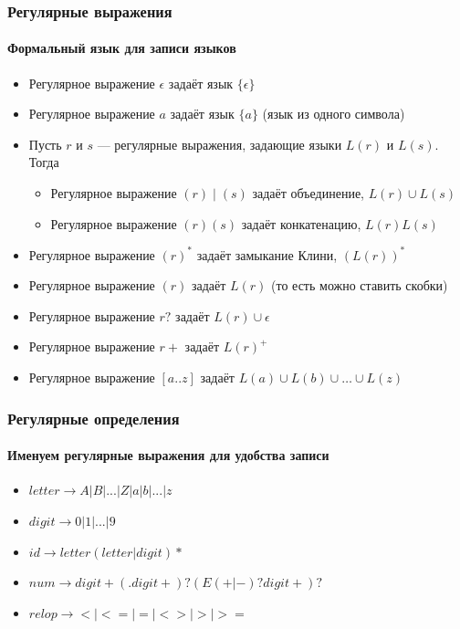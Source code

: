 \documentclass{../../slides-style}
\begin{document}
    \begin{frame}
        \frametitle{Регулярные выражения}
        \framesubtitle{Формальный язык для записи языков}
        \begin{itemize}
            \item Регулярное выражение $\epsilon$ задаёт язык $\{\epsilon\}$
            \item Регулярное выражение $a$ задаёт язык $\{a\}$ (язык из одного символа)
            \item Пусть $r$ и $s$ --- регулярные выражения, задающие языки $L(r)$ и $L(s)$. Тогда
            \begin{itemize}
                \item Регулярное выражение $(r) \mid (s)$ задаёт объединение, $L(r) \cup L(s)$
                \item Регулярное выражение $(r)(s)$ задаёт конкатенацию, $L(r)L(s)$
            \end{itemize}
            \item Регулярное выражение $(r)^*$ задаёт замыкание Клини, $(L(r))^*$
            \item Регулярное выражение $(r)$ задаёт $L(r)$ (то есть можно ставить скобки)
            \item Регулярное выражение $r?$ задаёт $L(r) \cup \epsilon$
            \item Регулярное выражение $r+$ задаёт $L(r)^+$
            \item Регулярное выражение $[a..z]$ задаёт $L(a) \cup L(b) \cup \ldots \cup L(z)$
        \end{itemize}
    \end{frame}

    \begin{frame}
        \frametitle{Регулярные определения}
        \framesubtitle{Именуем регулярные выражения для удобства записи}
        \begin{itemize}
            \item $letter \rightarrow A | B | ... | Z | a | b | ... | z$
            \item $digit \rightarrow 0 | 1 | ... | 9$
            \item $id \rightarrow letter (letter | digit)*$
            \item $num \rightarrow digit+ (. digit+)? (E(+ | -)? digit+)?$
            \item $relop \rightarrow < | <= | = | <> | > | >=$
        \end{itemize}
    \end{frame}
\end{document}
